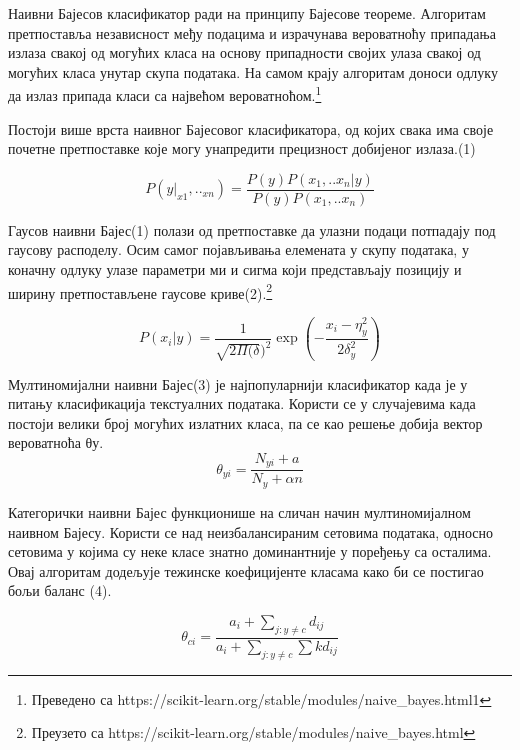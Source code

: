 \documentclass[11pt]{article} %
\begin{document}
Наивни Бајесов класификатор ради на принципу Бајесове теореме. Алгоритам претпоставља независност међу подацима и израчунава вероватноћу припадања излаза свакој од могућих класа на основу припадности својих улаза свакој од могућих класа унутар скупа података. На самом крају алгоритам доноси одлуку да излаз припада класи са највећом вероватноћом.\footnote{Преведено са https://scikit-learn.org/stable/modules/naive_bayes.html1}


Постоји више врста наивног Бајесовог класификатора, од којих свака има своје почетне претпоставке које могу унапредити прецизност добијеног излаза.(1)

\begin{equation}
P(y|_{x1},.._{xn}) = \frac{P(y)P(x_{1},..x_{n}|y)}{P(y)P(x_{1},..x_{n})}
\end{equation}

Гаусов наивни Бајес(1) полази од претпоставке да улазни подаци потпадају под гаусову расподелу. Осим самог појављивања елемената у скупу података, у коначну одлуку улазе параметри ми и сигма који представљају позицију и ширину претпостављене гаусове криве(2).\footnote{Преузето са https://scikit-learn.org/stable/modules/naive_bayes.html }


\begin{equation}
P(x_{i}|y) = \frac{1}{\sqrt{2\Pi{}(\delta})^2}\exp{(-\frac{x_{i}-\eta_{y}^2}{2\delta^2_{y}})}
\end{equation}

Мултиномијални наивни Бајес(3) је најпопуларнији класификатор када је у питању класификација текстуалних података. Користи се у случајевима када постоји велики број могућих излатних класа, па се као решење добија вектор вероватноћа θу.
\begin{equation}
\theta_{yi} = \frac{N_{yi}+a}{N_{y}+\alpha n }
\end{equation}

Категорички наивни Бајес функционише на сличан начин мултиномијалном наивном Бајесу. Користи се над неизбалансираним сетовима података, односно сетовима у којима су неке класе знатно доминантније у поређењу са осталима. Овај алгоритам додељује тежинске коефицијенте класама како би се постигао бољи баланс (4).

\begin{equation}
\theta_{ci} = \frac{a_{i}+\sum_{j:y\neq c}d_{ij}}{a_{i}+\sum_{j:y\neq c}\sum{k}{d_{ij}}}
\end{equation}
\end{document}
